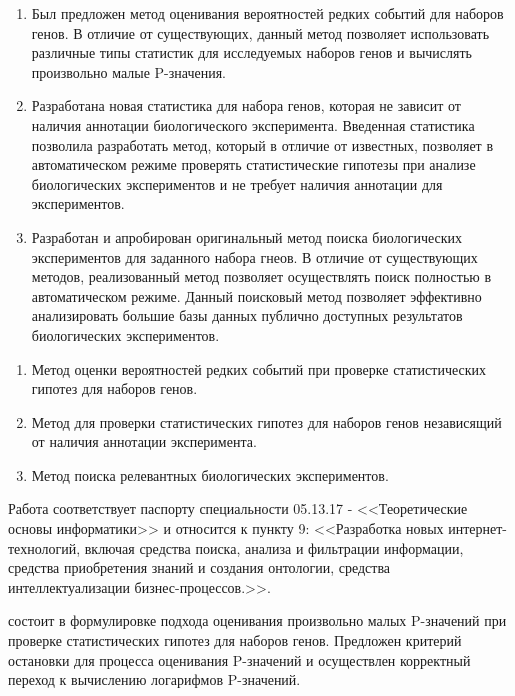 {\novelty}
\begin{enumerate}[beginpenalty=10000] %
    \item Был предложен метод оценивания вероятностей редких событий для наборов генов.
    В отличие от существующих, данный метод позволяет использовать различные типы статистик для исследуемых наборов генов и вычислять произвольно малые P-значения. 
    \item Разработана новая статистика для набора генов, которая не зависит от наличия аннотации биологического эксперимента.
    Введенная статистика позволила разработать метод, который в отличие от известных, позволяет в автоматическом режиме проверять статистические гипотезы при анализе биологических экспериментов и не требует наличия аннотации для экспериментов.
    \item Разработан и апробирован оригинальный метод поиска биологических экспериментов для заданного набора гнеов.
    В отличие от существующих методов, реализованный метод позволяет осуществлять поиск полностью в автоматическом режиме. Данный поисковый метод позволяет эффективно анализировать большие базы данных публично доступных результатов биологических экспериментов.
\end{enumerate}

{}
\begin{enumerate}[beginpenalty=10000] %
    \item Метод оценки вероятностей редких событий при проверке статистических гипотез для наборов генов.
    \item Метод для проверки статистических гипотез для наборов генов независящий от наличия аннотации эксперимента.
    \item Метод поиска релевантных биологических экспериментов.
\end{enumerate}


{\passport} Работа соответствует паспорту специальности 05.13.17 - <<Теоретические основы информатики>> и относится к пункту 9: <<Разработка новых интернет-технологий, включая средства поиска, анализа и фильтрации информации, средства приобретения знаний и создания онтологии, средства интеллектуализации бизнес-процессов.>>.

{\theorinfluence} состоит в формулировке подхода оценивания произвольно малых P-значений при проверке статистических гипотез для наборов генов. Предложен критерий остановки для процесса оценивания P-значений и осуществлен корректный переход к вычислению логарифмов P-значений.


